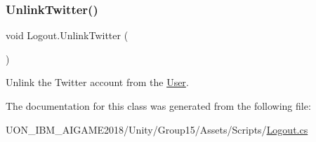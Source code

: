 \subsubsection{\texorpdfstring{UnlinkTwitter()}{UnlinkTwitter()}}
{\footnotesize\ttfamily void Logout.\+Unlink\+Twitter (\begin{DoxyParamCaption}{ }\end{DoxyParamCaption})\hspace{0.3cm}{\ttfamily [inline]}}



Unlink the Twitter account from the \mbox{\hyperlink{class_user}{User}}. 



The documentation for this class was generated from the following file\+:\begin{DoxyCompactItemize}
\item 
U\+O\+N\+\_\+\+I\+B\+M\+\_\+\+A\+I\+G\+A\+M\+E2018/\+Unity/\+Group15/\+Assets/\+Scripts/\mbox{\hyperlink{_logout_8cs}{Logout.\+cs}}\end{DoxyCompactItemize}

